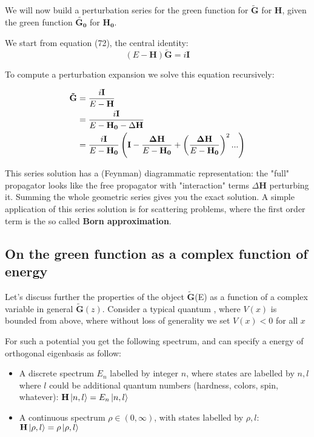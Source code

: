\documentclass[11pt]{article}
\theoremstyle{definition}
\begin{document}
We will now build a perturbation series for the green function for $\tilde{\mathbf{G}}$ for $\mathbf{H}$, given the green function $\tilde{\mathbf{G_0}}$ for $\mathbf{H_0}$.

We start from equation (72), the central identity:
$$ (E- \mathbf{H}) \mathbf{\tilde{G}} = i \mathbf{I}$$

To compute a perturbation expansion we solve this equation recursively:

\begin{align}
\mathbf{\tilde{G}} &= {i \mathbf{I} \over E - \mathbf{H}} \\
& = {i \mathbf{I} \over E - \mathbf{H_0} - \Delta \mathbf{H}} \\
& = {i \mathbf{I} \over E - \mathbf{H_0}} \left(\mathbf{I} - {\mathbf{\Delta H} \over E - \mathbf{H_0}} + \left({\mathbf{\Delta H} \over E - \mathbf{H_0}} \right)^2 ...\right)
\end{align}

This series solution has a (Feynman) diagrammatic representation: the "full" propagator looks like the free propagator with "interaction" terms $\Delta \mathbf{H}$ perturbing it.  Summing the whole geometric series gives you the exact solution.  A simple application of this series solution is for scattering problems, where the first order term is the so called \textbf{Born approximation}.

\subsection{On the green function as a complex function of energy}
\newcommand{\tG}{\mathbf{\tilde{G}}}
Let's discuss further the properties of the object $\tG$(E) as a function of a complex variable in general $\tG(z)$.  Consider a typical quantum , where $V(x)$ is bounded from above, where without loss of generality we set $V(x) < 0$ for all $x$

For such a potential you get the following spectrum, and can specify a energy of orthogonal eigenbasis as follow:
\begin{itemize}
\item A discrete spectrum $E_n$ labelled by integer $n$, where states are labelled by $n, l$  where $l$ could be additional quantum numbers (hardness, colors, spin, whatever): $ \mathbf{H} \ket{n, l} = E_n \ket{n, l}$ 
\item A continuous spectrum $\rho \in (0, \infty)$, with states labelled by $\rho, l$:  $\mathbf{H} \ket{\rho, l} = \rho \ket{\rho, l}$
\end{itemize}
\end{document}
